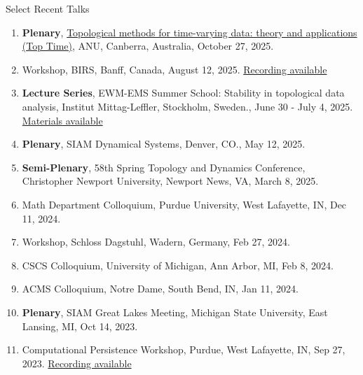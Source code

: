 \documentclass{resume} %
\begin{document}
%
\begin{rSection}{Select Recent Talks}


\begin{enumerate}
\item \textbf{Plenary}, \href{https://maths.anu.edu.au/news-events/events/topological-methods-time-varying-data-theory-and-applications-top-time}{Topological methods for time-varying data: theory and applications (Top Time)}, ANU, Canberra, Australia, October 27, 2025. 


\item Workshop, BIRS, Banff, Canada, August 12, 2025. \href{https://www.birs.ca/events/2025/5-day-workshops/25w5481/videos/watch/202508121404-Munch.html}{Recording available}

\item \textbf{Lecture Series}, EWM-EMS Summer School: Stability in topological data analysis, Institut Mittag-Leffler, Stockholm, Sweden., June 30 - July 4, 2025. \href{https://www.mittag-leffler.se/activities/ewm-ems-summer-school-stability-in-topological-data-analysis/}{Materials available}

\item \textbf{Plenary}, SIAM Dynamical Systems, Denver, CO., May 12, 2025. 


\item \textbf{Semi-Plenary}, 58th Spring Topology and Dynamics Conference, Christopher Newport University, Newport News, VA, March 8, 2025. 

\item Math Department Colloquium, Purdue University, West Lafayette, IN, Dec 11, 2024. 



\item Workshop, Schloss Dagstuhl, Wadern, Germany, Feb 27, 2024. 

\item CSCS Colloquium, University of Michigan, Ann Arbor, MI, Feb 8, 2024. 

\item ACMS Colloquium, Notre Dame, South Bend, IN, Jan 11, 2024. 

\item \textbf{Plenary}, SIAM Great Lakes Meeting, Michigan State University, East Lansing, MI, Oct 14, 2023. 

\item Computational Persistence Workshop, Purdue, West Lafayette, IN, Sep 27, 2023. \href{https://youtu.be/PJBgBoowQA4}{Recording available}


\end{enumerate}
\end{rSection}
\end{document}
